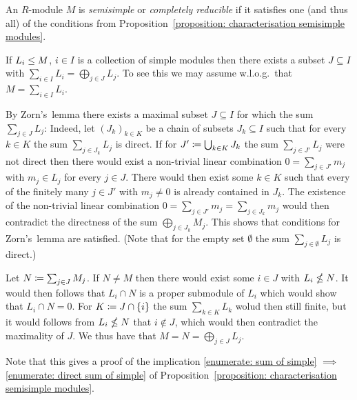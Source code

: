 \begin{definition}
  An $R$-module $M$ is \emph{semisimple} or \emph{completely reducible} if it satisfies one (and thus all) of the conditions from Proposition~\ref{proposition: characterisation semisimple modules}.
\end{definition}


\begin{remark}
  \label{remark: can replace sum by direct sum for ss}
  If $L_i \leq M$, $i \in I$ is a collection of simple modules then there exists a subset $J \subseteq I$ with $\sum_{i \in I} L_i = \bigoplus_{j \in J} L_j$.
  To see this we may assume w.l.o.g.\ that $M = \sum_{i \in I} L_i$.
  
  By Zorn’s~lemma there exists a maximal subset $J \subseteq I$ for which the sum $\sum_{j \in J} L_j$:
  Indeed, let $(J_k)_{k \in K}$ be a chain of subsets $J_k \subseteq I$ such that for every $k \in K$ the sum $\sum_{j \in J_k} L_j$ is direct.
  If for $J' \coloneqq \bigcup_{k \in K} J_k$ the sum $\sum_{j \in J'} L_j$ were not direct then there would exist a non-trivial linear combination $0 = \sum_{j \in J'} m_j$ with $m_j \in L_j$ for every $j \in J$.
  There would then exist some $k \in K$ such that every of the finitely many $j \in J'$ with $m_j \neq 0$ is already contained in $J_k$.
  The existence of the non-trivial linear combination $0 = \sum_{j \in J'} m_j = \sum_{j \in J_k} m_j$ would then contradict the directness of the sum $\bigoplus_{j \in J_k} M_j$.
  This shows that conditions for Zorn’s~lemma are satisfied.
  (Note that for the empty set $\emptyset$ the sum $\sum_{j \in \emptyset} L_j$ is direct.)
  
  Let $N \coloneqq \sum_{j \in J} M_j$.
  If $N \neq M$ then there would exist some $i \in J$ with $L_i \nleq N$.
  It would then follows that $L_i \cap N$ is a proper submodule of $L_i$ which would show that $L_i \cap N = 0$.
  For $K \coloneqq J \cap \{i\}$ the sum $\sum_{k \in K} L_k$ wolud then still finite, but it would follows from $L_i \nleq N$ that $i \notin J$, which would then contradict the maximality of $J$.
  We thus have that $M = N = \bigoplus_{j \in J} L_j$.
  
  Note that this gives a proof of the implication \ref*{enumerate: sum of simple} $\implies$ \ref*{enumerate: direct sum of simple} of Proposition~\ref{proposition: characterisation semisimple modules}.
\end{remark}





